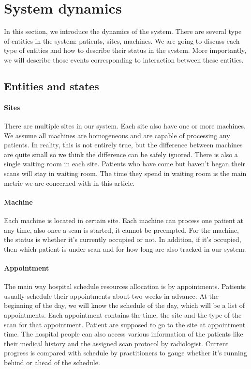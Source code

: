 \section{System dynamics}

In this section, we introduce the dynamics of the system. There are several type of entities in the system: patients, sites, machines. We are going to discuss each type of entities and how to describe their status in the system. More importantly, we will describe those events corresponding to interaction between these entities.

\subsection{Entities and states}

\paragraph{Sites} There are multiple sites in our system. Each site also have one or more machines. We assume all machines are homogeneous and are capable of processing any patients. In reality, this is not entirely true, but the difference between machines are quite small so we think the difference can be safely ignored. There is also a single waiting room in each site. Patients who have come but haven't began their scans will stay in waiting room. The time they spend in waiting room is the main metric we are concerned with in this article.

\paragraph{Machine} Each machine is located in certain site. Each machine can process one patient at any time, also once a scan is started, it cannot be preempted. For the machine, the status is whether it's currently occupied or not. In addition, if it's occupied, then which patient is under scan and for how long are also tracked in our system.

\paragraph{Appointment} The main way hospital schedule resources allocation is by appointments. Patients usually schedule their appointments about two weeks in advance. At the beginning of the day, we will know the schedule of the day, which will be a list of appointments. Each appointment contains the time, the site and the type of the scan for that appointment. Patient are supposed to go to the site at appointment time. The hospital people can also access various information of the patients like their medical history and the assigned scan protocol by radiologist. Current progress is compared with schedule by practitioners to gauge whether it's running behind or ahead of the schedule.

